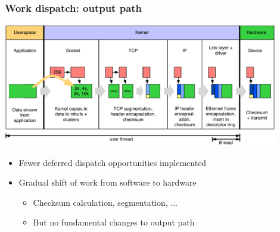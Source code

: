 \begin{frame}
  \frametitle{Work dispatch: output path}

  \begin{center}
    \includegraphics[width=0.9\textwidth]{../../figures/network-dispatch-output.pdf}
  \end{center}

  \begin{itemize}
    \item Fewer deferred dispatch opportunities implemented
    \item Gradual shift of work from software to hardware
    \begin{itemize}
      \item Checksum calculation, segmentation, ...
      \item But no fundamental changes to output path
    \end{itemize}
  \end{itemize}

\end{frame}

